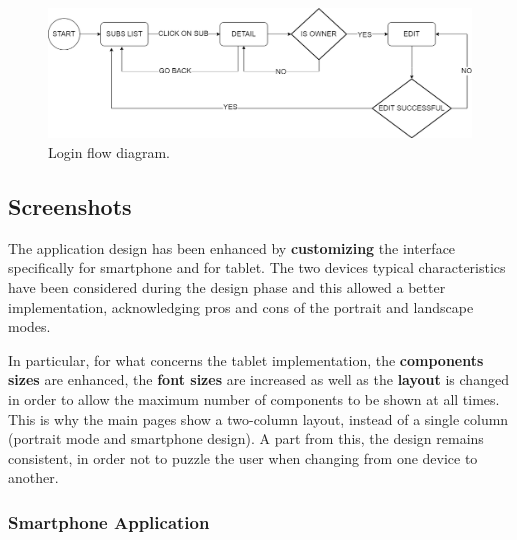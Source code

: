 \documentclass[12pt]{article}
\begin{document}
\begin{figure}[h!]
    \begin{center}
        \includegraphics[width=\textwidth, clip]{../../assets/editflow.png}
    \end{center}
    \caption{Login flow diagram.}
    \label{fig:editflow}
\end{figure}


\subsection{Screenshots}
The application design has been enhanced by \textbf{customizing} the interface specifically for smartphone and for tablet. The two devices typical characteristics have been considered during the design phase and this allowed a better implementation, acknowledging pros and cons of the portrait and landscape modes.

In particular, for what concerns the tablet implementation, the \textbf{components sizes} are enhanced, the \textbf{font sizes} are increased as well as the \textbf{layout} is changed in order to allow the maximum number of components to be shown at all times. This is why the main pages show a two-column layout, instead of a single column (portrait mode and smartphone design). A part from this, the design remains consistent, in order not to puzzle the user when changing from one device to another.

\subsubsection{Smartphone Application}
\end{document}
